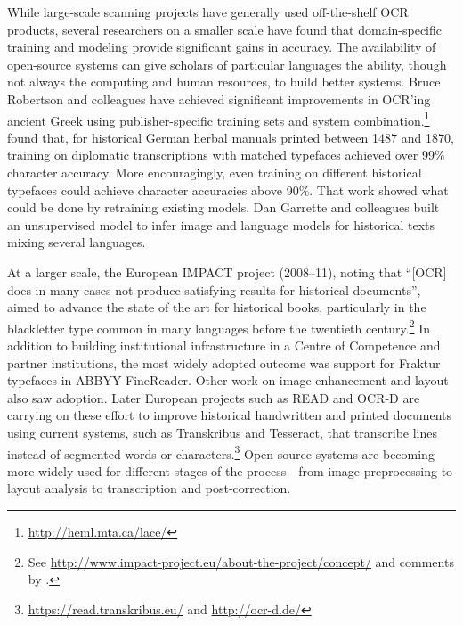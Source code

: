 \documentclass[twoside,11pt]{report}
\begin{document}
While large-scale scanning projects have generally used off-the-shelf OCR products, several researchers on a smaller scale have found that domain-specific training and modeling provide significant gains in accuracy. The availability of open-source systems can give  scholars of particular languages the ability, though not always the computing and human resources, to build better systems. Bruce Robertson and colleagues have achieved significant improvements in OCR'ing ancient Greek using publisher-specific training sets and system combination.\footnote{\url{http://heml.mta.ca/lace/}}  \cite{springmann17:_ocr_histor_print_applic_build_diach_corpor} found that, for historical German herbal manuals printed between 1487 and 1870, training on diplomatic transcriptions with matched typefaces achieved over 99\% character accuracy. More encouragingly, even training on different historical typefaces could achieve character accuracies above 90\%. That work showed what could be done by retraining existing models. Dan Garrette and colleagues \citeyearpar{garrette15:_unsup_code_switc_multil_histor_docum_trans} built an unsupervised model to infer image and language models for historical texts mixing several languages.

At a larger scale, the European IMPACT project (2008--11), noting that ``[OCR] does in many cases not produce satisfying results for historical documents'', aimed to advance the state of the art for historical books, particularly in the blackletter type common in many languages before the twentieth century.\footnote{See \url{http://www.impact-project.eu/about-the-project/concept/} and comments by \citet[\S{}4.3.2]{piotrowski12:nlpht}.}  In addition to building institutional infrastructure in a Centre of Competence and partner institutions, the most widely adopted outcome was support for Fraktur typefaces in ABBYY FineReader.  Other work on image enhancement and layout also saw adoption.  Later European projects such as READ and OCR-D are carrying on these effort to improve historical handwritten and printed documents using current systems, such as Transkribus and Tesseract, that transcribe lines instead of segmented words or characters.\footnote{\url{https://read.transkribus.eu/} and \url{http://ocr-d.de/}}  Open-source systems are becoming more widely used for different stages of the process---from image preprocessing to layout analysis to transcription and post-correction.
\end{document}
